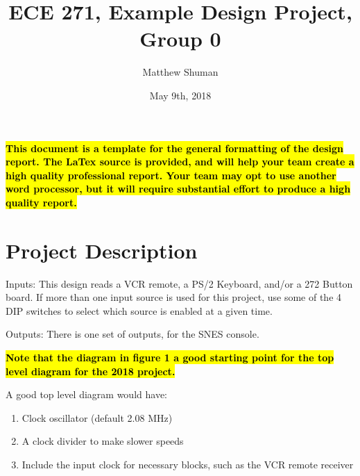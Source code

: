 \documentclass[a4paper]{article}
\title{ECE 271, Example Design Project, Group 0}
\author{Matthew Shuman}
\date{May 9th, 2018}
\begin{document}

\maketitle
\tableofcontents
\newpage
\textbf{\textcolor{red}{\hl{This document is a template for the general formatting of the design report.  The LaTex source is provided, and will help your team create a high quality professional report. Your team may opt to use another word processor, but it will require substantial effort to produce a high quality report. }}}
\section{Project Description}
Inputs:  This design reads a VCR remote, a PS/2 Keyboard, and/or a 272 Button board.  If more than one input source is used for this project, use some of the 4 DIP switches to select which source is enabled at a given time.

Outputs:  There is one set of outputs, for the SNES console.  

\textbf{\textcolor{red}{\hl{Note that the diagram in figure 1 a good starting point for the top level diagram for the 2018 project.  }}}


\vspace{.25in}
A good top level diagram would have:
\begin{enumerate}
\item Clock oscillator (default 2.08 MHz)
\item A clock divider to make slower speeds
\item Include the input clock for necessary blocks, such as the VCR remote receiver
\end{enumerate}
\end{document}

